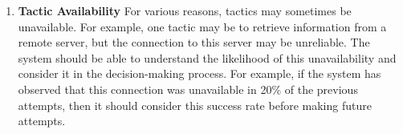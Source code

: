 \documentclass{article}
\newcommand{\todo}[1]{\textcolor{cyan}{\textbf{[#1]}}}
\newcommand{\dan}[1]{\textcolor{blue}{{\it [Dan says: #1]}}}
\begin{document}
\begin{enumerate}[noitemsep]
   


    
    
    
    
    
    
     
    








\item \textbf{Tactic Availability} For various reasons, tactics may sometimes be unavailable. For example, one tactic may be to retrieve information from a remote server, but the connection to this server may be unreliable. The system should be able to understand the likelihood of this unavailability and consider it in the decision-making process. For example, if the system has observed that this connection was unavailable in 20\% of the previous attempts, then it should consider this success rate before making future attempts. 


\end{enumerate}
\end{document}
